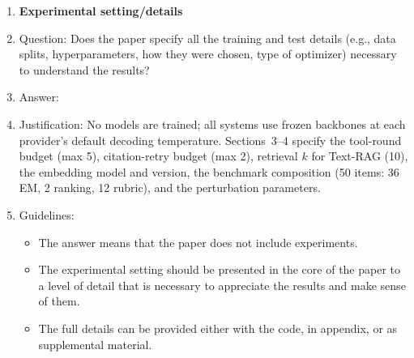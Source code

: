 \begin{enumerate}
\item {\bf Experimental setting/details}
    \item[] Question: Does the paper specify all the training and test details (e.g., data splits, hyperparameters, how they were chosen, type of optimizer) necessary to understand the results?
    \item[] Answer: \answerYes{}
    \item[] Justification: No models are trained; all systems use frozen backbones at each provider's default decoding temperature. Sections~3--4 specify the tool-round budget (max 5), citation-retry budget (max 2), retrieval $k$ for Text-RAG (10), the embedding model and version, the benchmark composition (50 items: 36 EM, 2 ranking, 12 rubric), and the perturbation parameters.
    \item[] Guidelines:
    \begin{itemize}
        \item The answer \answerNA{} means that the paper does not include experiments.
        \item The experimental setting should be presented in the core of the paper to a level of detail that is necessary to appreciate the results and make sense of them.
        \item The full details can be provided either with the code, in appendix, or as supplemental material.
    \end{itemize}


\end{enumerate}
